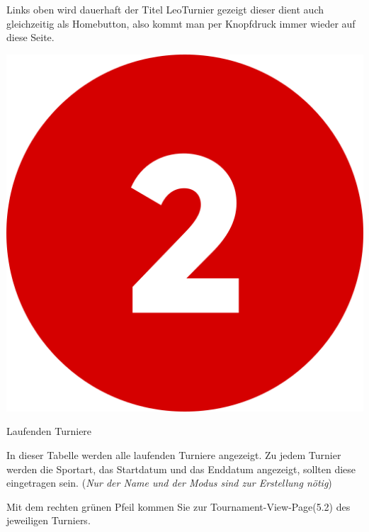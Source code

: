 Links oben wird dauerhaft der Titel LeoTurnier gezeigt dieser dient auch gleichzeitig als Homebutton,
also kommt man per Knopfdruck immer wieder auf diese Seite.
\bigskip


\includegraphics[scale=0.05]{pics/user-guide/numbers/number-2.png} \begin{LARGE} Laufenden Turniere \end{LARGE}

In dieser Tabelle werden alle laufenden Turniere angezeigt. Zu jedem Turnier werden die Sportart, das Startdatum und das Enddatum angezeigt,
sollten diese eingetragen sein. (\textit{Nur der Name und der Modus sind zur Erstellung nötig})

Mit dem rechten grünen Pfeil kommen Sie zur Tournament-View-Page(5.2) des jeweiligen Turniers.
\bigskip

